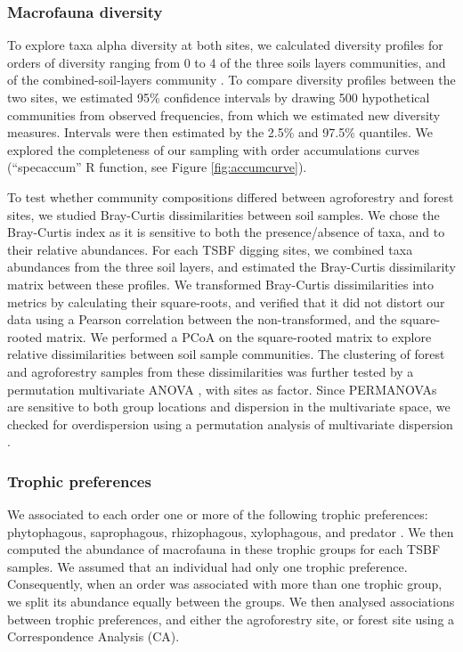 \documentclass[fleqn,10pt]{ArtEcoFoG} %
\begin{document}
\subsubsection{Macrofauna diversity}\label{macrofauna-diversity}

To explore taxa alpha diversity at both sites, we calculated diversity profiles for orders of diversity ranging from 0 to 4 of the three soils layers communities, and of the combined-soil-layers community \citep[``entropart'' R package,][]{marcon_entropart_2015}. To compare diversity profiles between the two sites, we estimated 95\% confidence intervals by drawing 500 hypothetical communities from observed frequencies, from which we estimated new diversity measures. Intervals were then estimated by the 2.5\% and 97.5\% quantiles. We explored the completeness of our sampling with order accumulations curves (``specaccum'' R function, see Figure \ref{fig:accumcurve}).

To test whether community compositions differed between agroforestry and forest sites, we studied Bray-Curtis dissimilarities between soil samples. We chose the Bray-Curtis index as it is sensitive to both the presence/absence of taxa, and to their relative abundances. For each TSBF digging sites, we combined taxa abundances from the three soil layers, and estimated the Bray-Curtis dissimilarity matrix between these profiles. We transformed Bray-Curtis dissimilarities into metrics by calculating their square-roots, and verified that it did not distort our data using a Pearson correlation between the non-transformed, and the square-rooted matrix. We performed a PCoA on the square-rooted matrix to explore relative dissimilarities between soil sample communities. The clustering of forest and agroforestry samples from these dissimilarities was further tested by a permutation multivariate ANOVA \citep[PERMANOVA,][]{kenett_permutational_2017}, with sites as factor. Since PERMANOVAs are sensitive to both group locations and dispersion in the multivariate space, we checked for overdispersion using a permutation analysis of multivariate dispersion \citep[PERMDISP,][]{anderson_distancebased_2006}.

\subsubsection{Trophic preferences}\label{trophic-preferences}

We associated to each order one or more of the following trophic preferences: phytophagous, saprophagous, rhizophagous, xylophagous, and predator \citep{decaens_identification_2015, potapov_feeding_2022}. We then computed the abundance of macrofauna in these trophic groups for each TSBF samples. We assumed that an individual had only one trophic preference. Consequently, when an order was associated with more than one trophic group, we split its abundance equally between the groups. We then analysed associations between trophic preferences, and either the agroforestry site, or forest site using a Correspondence Analysis (CA).
\end{document}
